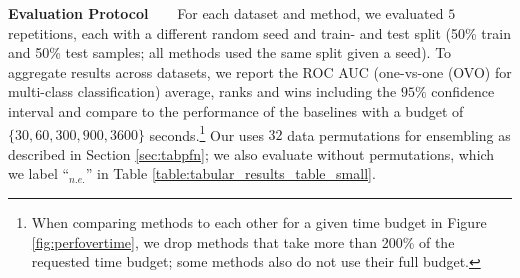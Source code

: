 \documentclass{article}
\newcommand{\slimparagraph}[1]{\textbf{#1~~~}}
\begin{document}
\slimparagraph{Evaluation Protocol} For each dataset and method, we evaluated $5$ repetitions, each with a different random seed and train- and test split (50\% train and 50\% test samples; all methods used the same split given a seed). To aggregate results across datasets, we report the ROC AUC (one-vs-one (OVO) for multi-class classification) average, ranks and wins including the $95\%$ confidence interval and compare to the performance of the baselines with a budget of $\{30, 60, 300, 900, 3600\}$ seconds.\footnote{When comparing methods to each other for a given time budget in Figure \ref{fig:perfovertime}, we drop methods that take more than 200\% of the requested time budget; some methods also do not use their full budget.} Our \methodname{} uses $32$ data permutations for ensembling as described in Section \ref{sec:tabpfn}; we also evaluate \methodname{} without permutations, which we label ``\methodname{}$_{n.e.}$'' in Table \ref{table:tabular_results_table_small}.%
%
\begin{table}[t]
    \centering
    \smaller
    
    \caption{Results on the 18 numerical datasets in \openmlcc{} for 60 minutes requested time per data-split. $\pm$ values indicate a metric's standard deviation. If available, all baselines optimize ROC AUC.
    TabPFN n.e. is a faster version of our method, without ensembling, while TabPFN + AutoGluon is an ensemble of TabPFN and AutoGluon. Separate inference times in Table \ref{app:table:tabular_results_table}.}
    \label{table:tabular_results_table_small}
\end{table}
\end{document}
